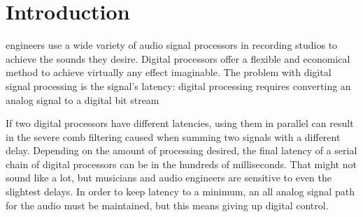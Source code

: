 \documentclass[journal]{IEEEtran}
\begin{document}
	
	
	
	
	
	\IEEEpeerreviewmaketitle
	
	
	
	\section{Introduction}
	
	  engineers use a wide variety of audio signal processors in recording studios to achieve the sounds
	they desire. Digital processors offer a flexible and economical method to achieve virtually any effect imaginable. The problem with digital signal processing is the signal's latency: digital processing requires converting an analog signal to a digital bit stream
	
	If two digital processors have different latencies, using them in parallel can result in the severe comb filtering caused when summing two signals with a different delay. Depending on the amount of processing desired, the final latency of a serial chain of digital processors can be in the hundreds of milliseconds. That might not sound like a lot, but musicians and audio engineers are sensitive to even the slightest delays. In order to keep latency to a minimum, an all analog signal path for the audio must be maintained, but this means giving up digital control. 
	
\end{document}
